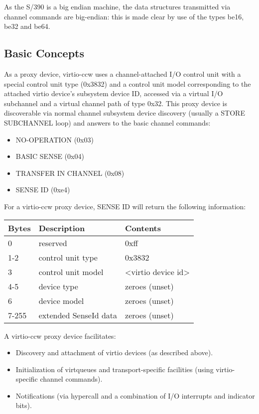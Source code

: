As the S/390 is a big endian machine, the data structures transmitted
via channel commands are big-endian: this is made clear by use of
the types be16, be32 and be64.

\subsection{Basic Concepts}\label{sec:Virtio Transport Options / Virtio over channel I/O / Basic Concepts}

As a proxy device, virtio-ccw uses a channel-attached I/O control
unit with a special control unit type (0x3832) and a control unit
model corresponding to the attached virtio device's subsystem
device ID, accessed via a virtual I/O subchannel and a virtual
channel path of type 0x32. This proxy device is discoverable via
normal channel subsystem device discovery (usually a STORE
SUBCHANNEL loop) and answers to the basic channel commands:

\begin{itemize}
\item NO-OPERATION (0x03)
\item BASIC SENSE (0x04)
\item TRANSFER IN CHANNEL (0x08)
\item SENSE ID (0xe4)
\end{itemize}

For a virtio-ccw proxy device, SENSE ID will return the following
information:

\begin{tabular}{ |l|l|l| }
\hline
Bytes & Description & Contents \\
\hline \hline
0     & reserved              & 0xff \\
\hline
1-2   & control unit type     & 0x3832 \\
\hline
3     & control unit model    & <virtio device id> \\
\hline
4-5   & device type           & zeroes (unset) \\
\hline
6     & device model          & zeroes (unset) \\
\hline
7-255 & extended SenseId data & zeroes (unset) \\
\hline
\end{tabular}

A virtio-ccw proxy device facilitates:
\begin{itemize} 
\item Discovery and attachment of virtio devices (as described above).
\item Initialization of virtqueues and transport-specific facilities (using
      virtio-specific channel commands).
\item Notifications (via hypercall and a combination of I/O interrupts
      and indicator bits).
\end{itemize} 

